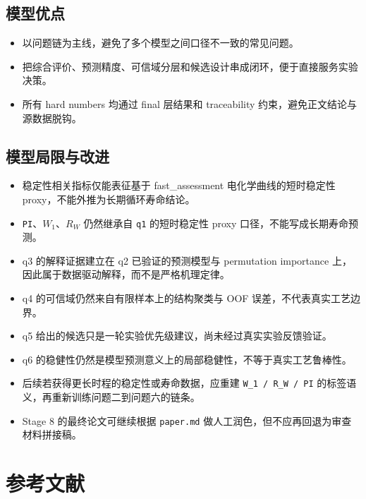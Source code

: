 \documentclass[bwprint]{gmcmthesis}
\numberwithin{figure}{section}
\begin{document}
\subsection{模型优点}

\begin{itemize}
\item 以问题链为主线，避免了多个模型之间口径不一致的常见问题。
\item 把综合评价、预测精度、可信域分层和候选设计串成闭环，便于直接服务实验决策。
\item 所有 hard numbers 均通过 final 层结果和 traceability 约束，避免正文结论与源数据脱钩。
\end{itemize}

\subsection{模型局限与改进}

\begin{itemize}
\item 稳定性相关指标仅能表征基于 fast\_assessment 电化学曲线的短时稳定性 proxy，不能外推为长期循环寿命结论。
\item \texttt{PI}、$W_1$、$R_W$ 仍然继承自 \texttt{q1} 的短时稳定性 proxy 口径，不能写成长期寿命预测。
\item q3 的解释证据建立在 q2 已验证的预测模型与 permutation importance 上，因此属于数据驱动解释，而不是严格机理定律。
\item q4 的可信域仍然来自有限样本上的结构聚类与 OOF 误差，不代表真实工艺边界。
\item q5 给出的候选只是一轮实验优先级建议，尚未经过真实实验反馈验证。
\item q6 的稳健性仍然是模型预测意义上的局部稳健性，不等于真实工艺鲁棒性。
\item 后续若获得更长时程的稳定性或寿命数据，应重建 \texttt{W\_1 / R\_W / PI} 的标签语义，再重新训练问题二到问题六的链条。
\item Stage 8 的最终论文可继续根据 \texttt{paper.md} 做人工润色，但不应再回退为审查材料拼接稿。
\end{itemize}

\section{参考文献}
\end{document}
